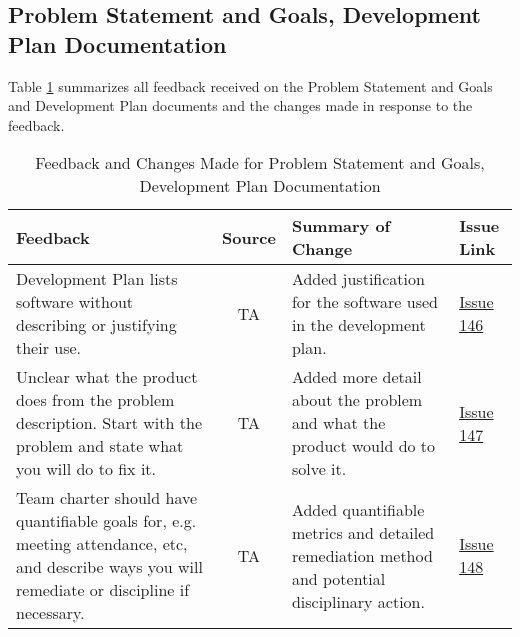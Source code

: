 \documentclass{article}
\begin{document}



\subsection{Problem Statement and Goals, Development Plan Documentation}
Table \ref{table:PSGDV} summarizes all feedback received on the Problem
Statement and Goals and Development Plan documents and the changes made in
response to the feedback.
\begin{table}[H]
\centering
\begin{tabularx}{\textwidth}{|X|c|X|p{1cm}|}
    \hline
    \textbf{Feedback} & \textbf{Source} & \textbf{Summary of Change}
    & \textbf{Issue Link} \\
    \hline
    Development Plan lists software without describing or justifying their use.
    & TA & Added justification for the software used in the development plan. &
    \href{https://github.com/SumanyaG/Alkalytics/issues/146}{Issue 146} \\
    \hline
    Unclear what the product does from the problem description. Start with the
    problem and state what you will do to fix it. & TA & Added more detail about
    the problem and what the product would do to solve it. &
    \href{https://github.com/SumanyaG/Alkalytics/issues/147}{Issue 147} \\
    \hline
    Team charter should have quantifiable goals for, e.g. meeting attendance,
    etc, and describe ways you will remediate or discipline if necessary. & TA &
    Added quantifiable metrics and detailed remediation method and potential
    disciplinary action. &
    \href{https://github.com/SumanyaG/Alkalytics/issues/148}{Issue 148} \\
    \hline
\end{tabularx}
\caption{Feedback and Changes Made for Problem Statement and Goals, Development Plan Documentation}
\label{table:PSGDV}
\end{table}
\end{document}
